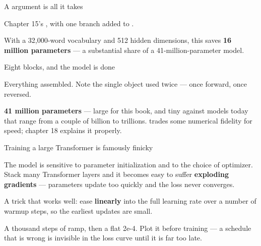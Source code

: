 \documentclass[aspectratio=169,11pt,t]{beamer}
\begin{document}
\begin{frame}[shrink=25]{A  argument is all it takes}
{\fontsize{9.4}{12.6}\selectfont\color{fg2}Chapter 15's , with one branch added to .\par}\vskip 4pt
{\fontsize{9.4}{12.6}\selectfont\color{fg2}With a 32,000-word vocabulary and 512 hidden dimensions, this saves \textbf{16 million parameters} --- a substantial share of a 41-million-parameter model.\par}\vskip 4pt
\end{frame}

\begin{frame}[shrink=25]{Eight blocks, and the model is done}
{\fontsize{9.4}{12.6}\selectfont\color{fg2}Everything assembled. Note the single  object used twice --- once forward, once reversed.\par}\vskip 4pt
{\fontsize{9.4}{12.6}\selectfont\color{fg2}\textbf{41 million parameters} --- large for this book, and tiny against models today that range from a couple of billion to trillions.  trades some numerical fidelity for speed; chapter 18 explains it properly.\par}\vskip 4pt
\end{frame}

\begin{frame}[shrink=25]{Training a large Transformer is famously finicky}
{\fontsize{9.4}{12.6}\selectfont\color{fg2}The model is sensitive to parameter initialization and to the choice of optimizer. Stack many Transformer layers and it becomes easy to suffer \textbf{exploding gradients} --- parameters update too quickly and the loss never converges.\par}\vskip 4pt
{\fontsize{9.4}{12.6}\selectfont\color{fg2}A trick that works well: ease \textbf{linearly} into the full learning rate over a number of warmup steps, so the earliest updates are small.\par}\vskip 4pt
{\fontsize{9.4}{12.6}\selectfont\color{fg2}A thousand steps of ramp, then a flat 2e-4. Plot it before training --- a schedule that is wrong is invisible in the loss curve until it is far too late.\par}\vskip 4pt
\end{frame}
\end{document}
